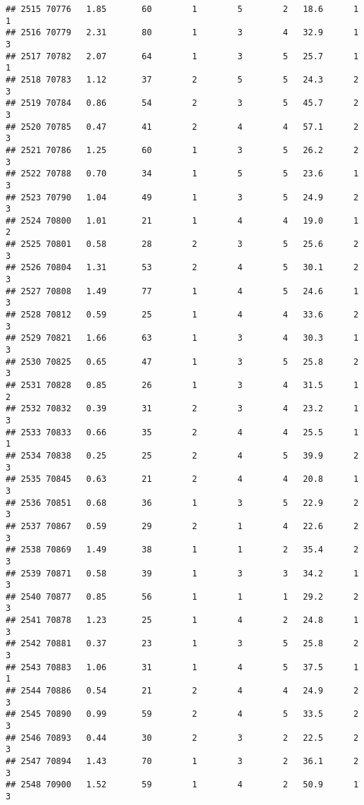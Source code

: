 \documentclass[
]{article}
\begin{document}
\begin{verbatim}
## 2515 70776   1.85       60        1        5        2   18.6      1      1
## 2516 70779   2.31       80        1        3        4   32.9      1      3
## 2517 70782   2.07       64        1        3        5   25.7      1      1
## 2518 70783   1.12       37        2        5        5   24.3      2      3
## 2519 70784   0.86       54        2        3        5   45.7      2      3
## 2520 70785   0.47       41        2        4        4   57.1      2      3
## 2521 70786   1.25       60        1        3        5   26.2      2      3
## 2522 70788   0.70       34        1        5        5   23.6      1      3
## 2523 70790   1.04       49        1        3        5   24.9      2      3
## 2524 70800   1.01       21        1        4        4   19.0      1      2
## 2525 70801   0.58       28        2        3        5   25.6      2      3
## 2526 70804   1.31       53        2        4        5   30.1      2      3
## 2527 70808   1.49       77        1        4        5   24.6      1      3
## 2528 70812   0.59       25        1        4        4   33.6      2      3
## 2529 70821   1.66       63        1        3        4   30.3      1      3
## 2530 70825   0.65       47        1        3        5   25.8      2      3
## 2531 70828   0.85       26        1        3        4   31.5      1      2
## 2532 70832   0.39       31        2        3        4   23.2      1      3
## 2533 70833   0.66       35        2        4        4   25.5      1      1
## 2534 70838   0.25       25        2        4        5   39.9      2      3
## 2535 70845   0.63       21        2        4        4   20.8      1      3
## 2536 70851   0.68       36        1        3        5   22.9      2      3
## 2537 70867   0.59       29        2        1        4   22.6      2      3
## 2538 70869   1.49       38        1        1        2   35.4      2      3
## 2539 70871   0.58       39        1        3        3   34.2      1      3
## 2540 70877   0.85       56        1        1        1   29.2      2      3
## 2541 70878   1.23       25        1        4        2   24.8      1      3
## 2542 70881   0.37       23        1        3        5   25.8      2      3
## 2543 70883   1.06       31        1        4        5   37.5      1      1
## 2544 70886   0.54       21        2        4        4   24.9      2      3
## 2545 70890   0.99       59        2        4        5   33.5      2      3
## 2546 70893   0.44       30        2        3        2   22.5      2      3
## 2547 70894   1.43       70        1        3        2   36.1      2      3
## 2548 70900   1.52       59        1        4        2   50.9      1      3

\end{verbatim}
\end{document}
